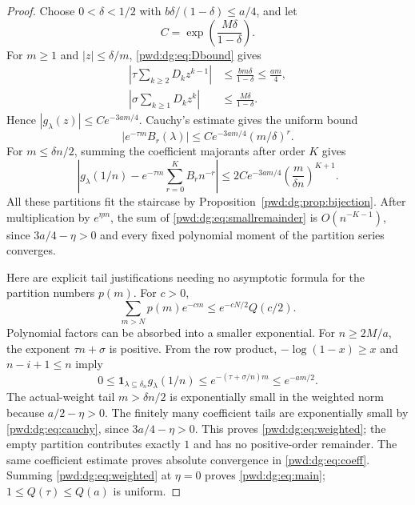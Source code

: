 \documentclass[11pt,letterpaper]{article}
\numberwithin{equation}{section}
\theoremstyle{remark}\newtheorem{remark}[theorem]{Remark}
\newcommand{\ind}{\mathbf 1}
\begin{document}
\begin{proof}
Choose $0<\delta<1/2$ with $b\delta/(1-\delta)\le a/4$, and let
\begin{equation}\label{pwd:dg:eq:Cdelta}
 C=\exp\left(\frac{M\delta}{1-\delta}\right).
\end{equation}
For $m\ge1$ and $|z|\le\delta/m$, \eqref{pwd:dg:eq:Dbound} gives
\begin{align*}
 \left|\tau\sum_{k\ge2}D_kz^{k-1}\right|
  &\le \frac{bm\delta}{1-\delta}\le\frac{am}4,\\
 \left|\sigma\sum_{k\ge1}D_kz^k\right|
  &\le\frac{M\delta}{1-\delta}.
\end{align*}
Hence $|g_\lambda(z)|\le Ce^{-3am/4}$. Cauchy's estimate gives the uniform bound
\begin{equation}\label{pwd:dg:eq:cauchy}
 |e^{-\tau m}B_r(\lambda)|\le Ce^{-3am/4}(m/\delta)^r.
\end{equation}
For $m\le\delta n/2$, summing the coefficient majorants after order $K$ gives
\begin{equation}\label{pwd:dg:eq:smallremainder}
 \left|g_\lambda(1/n)-e^{-\tau m}\sum_{r=0}^KB_rn^{-r}\right|
 \le 2Ce^{-3am/4}\left(\frac{m}{\delta n}\right)^{K+1}.
\end{equation}
All these partitions fit the staircase by Proposition~\ref{pwd:dg:prop:bijection}. After multiplication by $e^{\eta m}$, the sum of \eqref{pwd:dg:eq:smallremainder} is $O(n^{-K-1})$, since $3a/4-\eta>0$ and every fixed polynomial moment of the partition series converges.

Here are explicit tail justifications needing no asymptotic formula for the partition numbers $p(m)$. For $c>0$,
\begin{equation}\label{pwd:dg:eq:tail}
 \sum_{m>N}p(m)e^{-cm}\le e^{-cN/2}Q(c/2).
\end{equation}
Polynomial factors can be absorbed into a smaller exponential. For $n\ge2M/a$, the exponent $\tau n+\sigma$ is positive. From the row product, $-\log(1-x)\ge x$ and $n-i+1\le n$ imply
\begin{equation}\label{pwd:dg:eq:actualtail}
 0\le\ind_{\lambda\subseteq\delta_n}g_\lambda(1/n)
 \le e^{-(\tau+\sigma/n)m}\le e^{-am/2}.
\end{equation}
The actual-weight tail $m>\delta n/2$ is exponentially small in the weighted norm because $a/2-\eta>0$. The finitely many coefficient tails are exponentially small by \eqref{pwd:dg:eq:cauchy}, since $3a/4-\eta>0$. This proves \eqref{pwd:dg:eq:weighted}; the empty partition contributes exactly $1$ and has no positive-order remainder. The same coefficient estimate proves absolute convergence in \eqref{pwd:dg:eq:coeff}. Summing \eqref{pwd:dg:eq:weighted} at $\eta=0$ proves \eqref{pwd:dg:eq:main}; $1\le Q(\tau)\le Q(a)$ is uniform.
\end{proof}
\end{document}
